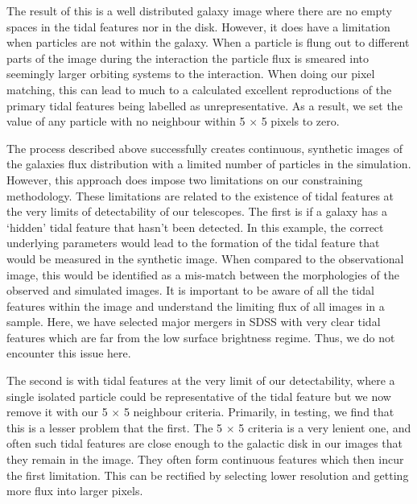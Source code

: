 The result of this is a well distributed galaxy image where there are no empty spaces in the tidal features nor in the disk. However, it does have a limitation when particles are not within the galaxy. When a particle is flung out to different parts of the image during the interaction the particle flux is smeared into seemingly larger orbiting systems to the interaction. When doing our pixel matching, this can lead to much to a calculated excellent reproductions of the primary tidal features being labelled as unrepresentative. As a result, we set the value of any particle with no neighbour within 5 $\times$ 5 pixels to zero. 

The process described above successfully creates continuous, synthetic images of the galaxies flux distribution with a limited number of particles in the simulation. However, this approach does impose two limitations on our constraining methodology. These limitations are related to the existence of tidal features at the very limits of detectability of our telescopes. The first is if a galaxy has a `hidden' tidal feature that hasn't been detected. In this example, the correct underlying parameters would lead to the formation of the tidal feature that would be measured in the synthetic image. When compared to the observational image, this would be identified as a mis-match between the morphologies of the observed and simulated images. It is important to be aware of all the tidal features within the image and understand the limiting flux of all images in a sample. Here, we have selected major mergers in SDSS with very clear tidal features which are far from the low surface brightness regime. Thus, we do not encounter this issue here.

The second is with tidal features at the very limit of our detectability, where a single isolated particle could be representative of the tidal feature but we now remove it with our 5 $\times$ 5 neighbour criteria. Primarily, in testing, we find that this is a lesser problem that the first. The 5 $\times$ 5 criteria is a very lenient one, and often such tidal features are close enough to the galactic disk in our images that they remain in the image. They often form continuous features which then incur the first limitation. This can be rectified by selecting lower resolution and getting more flux into larger pixels.

